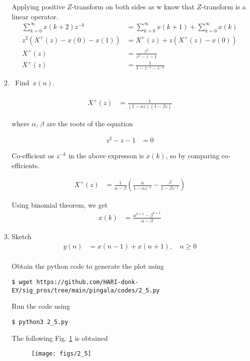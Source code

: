\documentclass[journal,12pt,twocolumn]{IEEEtran}
\renewcommand\thesection{\arabic{section}}
\begin{document}
\begin{enumerate}[label=\thesection.\arabic*,ref=\thesection.\theenumi]
		Applying positive $Z$-transform on both sides as w know that $Z$-transform is a linear operator.
		\begin{align}
			\sum_{k=0}^\infty x(k+2)z^{-k} & = \sum_{k=0}^{\infty} x(k+1) + \sum_{k=0}^{\infty} x(k)\\
			z^2\left( X^+(z) - x(0) - x(1) \right) & = X^+(z) + z\left(X^+(z) - x(0)\right)\\
			X^+(z) & = \frac{z^2}{z^2 - z - 1}\\
			X^+(z) & = \frac{1}{1-z^{-1}-z^{-2}}
		\end{align}

	\item Find $x(n)$.\\
	\solution\\
		\begin{align}
			X^+(z) & = \frac{1}{\left(1-\alpha z\right)\left(1-\beta z\right)}
		\end{align}
		
		where $\alpha$, $\beta$ are the roots of the equation
		
		\begin{align}
			z^2 - z - 1 & = 0
		\end{align}

		Co-efficient os $z^{-k}$ in the above expresson is $x(k)$, so by comparing co-efficients.

		\begin{align}
			X^+(z) & = \frac{1}{\alpha - \beta} \left(\frac{\alpha}{1-\alpha z^{-1}} - \frac{\beta}{1-\beta z^{-1}}\right)
		\end{align}

		Using binomial theorem, we get
		\begin{align}
			x(k) & = \frac{\alpha^{k+1} - \beta^{k+1}}{\alpha - \beta}
		\end{align}

	\item Sketch
		\begin{align}
			y(n) & = x(n-1) + x(n+1), \quad n \ge 0
			\label{eq:y_n}
		\end{align}
	\solution\\
		Obtain the python code to generate the plot using 
		\begin{lstlisting}
$ wget https://github.com/HARI-donk-EY/sig_pros/tree/main/pingala/codes/2_5.py
		\end{lstlisting}
		Run the code using 
		\begin{lstlisting}
$ python3 2_5.py
		\end{lstlisting}
		The following Fig. \ref{fig:2.5} is obtained
		\begin{figure}[ht]
			\begin{center}
				\texttt{[image: figs/2\_5]}
			\end{center}
			\label{fig:2.5}    
		\end{figure}
		


\end{enumerate}
\end{document}
